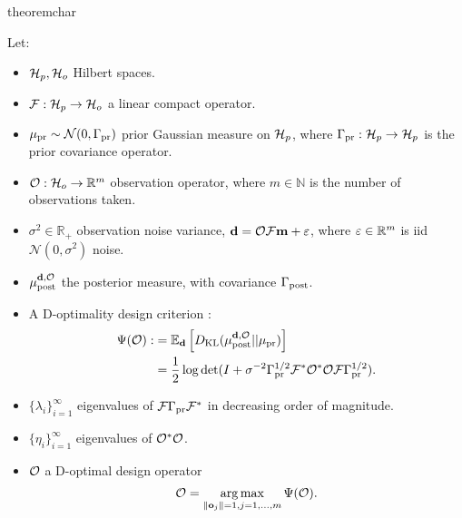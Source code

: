 \begin{restatable}{theorem}{char}\label{thm:char}

  Let:
  \begin{itemize}
  \item $\mathcal{H}_p, \mathcal{H}_o$ Hilbert spaces.
  \item $\mathcal{F}:\mathcal{H}_p \to \mathcal{H}_o$ a linear compact operator.
  \item $\mu_{\textup{pr}} \sim \mathcal{N}(0, \Gamma_{\textup{pr}})$ prior Gaussian measure on $\mathcal{H}_p$,
    where $\Gamma_{\textup{pr}}:\mathcal{H}_p \to \mathcal{H}_p$ is the prior covariance operator.
  \item $\mathcal{O}: \mathcal{H}_o \to \mathbb{R}^m$ observation operator, where $m
    \in \mathbb{N}$ is the number of observations taken. 
  \item $\sigma^2 \in \mathbb{R}_{+}$ observation noise variance,
    $\mathbf{d} = \mathcal{O} \mathcal{F} \mathbf{m} + \varepsilon$, where $\varepsilon \in \mathbb{R}^m$
    is iid $\mathcal{N}(0, \sigma^2)$ noise.
  \item $\mu_{\textup{post}}^{\mathbf{d}, \mathcal{O}}$ the posterior measure, with covariance $\Gamma_{\textup{post}}$.
  \item A D-optimality design criterion
    \cite{AlexanderianGloorGhattas14}:
    \begin{align*}
      \begin{split}
        \tar(\obs) :&= \mathbb{E}_{\data}\left [ D_{\text{KL}} (\post || \pr ) \right ] \\
        &= \frac12 \log \det ( I + \sigma^{-2} \prcov^{1/2} \fwd ^*
        \obs^* \obs \fwd \prcov^{1/2}).
      \end{split}
    \end{align*}
  \item $\{\lambda_i\}_{i=1}^\infty$ eigenvalues of $\mathcal{F}\Gamma_{\textup{pr}}\mathcal{F}^*$
    in decreasing order of magnitude.
  \item $\{\eta_i\}_{i=1}^\infty$ eigenvalues of $\mathcal{O}^*\mathcal{O}$.
  \item $\mathcal{O}$ a D-optimal design operator
    \begin{equation*}
      \obs = \argmax_{\|\meas_j\| = 1, j=1,\dots,m}\tar(\obs).
    \end{equation*}
  \end{itemize}


\end{restatable}
